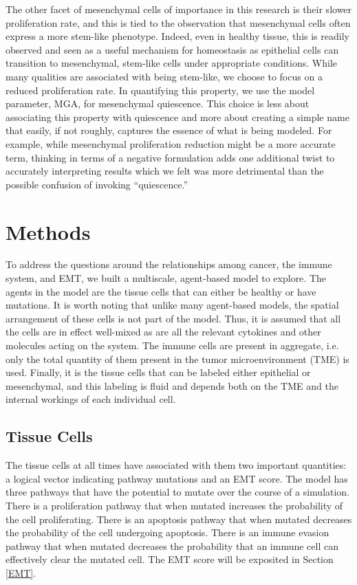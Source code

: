 \documentclass{article}
\begin{document}
The other facet of mesenchymal cells of importance in this research is their slower proliferation rate, and this is tied to the observation that mesenchymal cells often express a more stem-like phenotype.
Indeed, even in healthy tissue, this is readily observed and seen as a useful mechanism for homeostasis as epithelial cells can transition to mesenchymal, stem-like cells under appropriate conditions.
While many qualities are associated with being stem-like, we choose to focus on a reduced proliferation rate.
In quantifying this property, we use the model parameter, MGA, for mesenchymal quiescence.
This choice is less about associating this property with quiescence and more about creating a simple name that easily, if not roughly, captures the essence of what is being modeled.
For example, while mesenchymal proliferation reduction might be a more accurate term, thinking in terms of a negative formulation adds one additional twist to accurately interpreting results which we felt was more detrimental than the possible confusion of invoking ``quiescence.''



\section{Methods}
To address the questions around the relationships among cancer, the immune system, and EMT, we built a multiscale, agent-based model to explore.
The agents in the model are the tissue cells that can either be healthy or have mutations.
It is worth noting that unlike many agent-based models, the spatial arrangement of these cells is not part of the model.
Thus, it is assumed that all the cells are in effect well-mixed as are all the relevant cytokines and other molecules acting on the system.
The immune cells are present in aggregate, i.e. only the total quantity of them present in the tumor microenvironment (TME) is used.
Finally, it is the tissue cells that can be labeled either epithelial or mesenchymal, and this labeling is fluid and depends both on the TME and the internal workings of each individual cell.

\subsection{Tissue Cells}\label{TissueCells}
The tissue cells at all times have associated with them two important quantities: a logical vector indicating pathway mutations and an EMT score.
The model has three pathways that have the potential to mutate over the course of a simulation.
There is a proliferation pathway that when mutated increases the probability of the cell proliferating.
There is an apoptosis pathway that when mutated decreases the probability of the cell undergoing apoptosis.
There is an immune evasion pathway that when mutated decreases the probability that an immune cell can effectively clear the mutated cell.
The EMT score will be exposited in Section \ref{EMT}.
\end{document}
